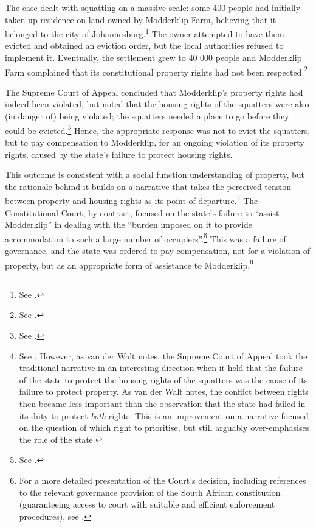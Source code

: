 The case dealt with squatting on a massive scale: some 400 people had initially taken up residence on land owned by Modderklip Farm, believing that it belonged to the city of Johannesburg.\footnote{See \cite[4]{modderklip05}.} The owner attempted to have them evicted and obtained an eviction order, but the local authorities refused to implement it. Eventually, the settlement grew to 40 000 people and Modderklip Farm complained that its constitutional property rights had not been respected.\footnote{See \cite[8]{modderklip05}.}

The Supreme Court of Appeal concluded that Modderklip's property rights had indeed been violated, but noted that the housing rights of the squatters were also (in danger of) being violated; the squatters needed a place to go before they could be evicted.\footnote{See \cite[21-26]{modderklip04}.} Hence, the appropriate response was not to evict the squatters, but to pay compensation to Modderklip, for an ongoing violation of its property rights, caused by the state's failure to protect housing rights.

This outcome is consistent with a social function understanding of property, but the rationale behind it builds on a narrative that takes the perceived tension between property and housing rights as its point of departure.\footnote{See \cite[152-156]{walt05}. However, as van der Walt notes, the Supreme Court of Appeal took the traditional narrative in an interesting direction when it held that the failure of the state to protect the housing rights of the squatters was the cause of its failure to protect property. As van der Walt notes, the conflict between rights then became less important than the observation that the state had failed in its duty to protect {\it both} rights. This is an improvement on a narrative focused on the question of which right to prioritise, but still arguably over-emphasises the role of the state.} The Constitutional Court, by contrast, focused on the state's failure to ``assist Modderklip'' in dealing with the ``burden imposed on it to provide accommodation to such a large number of occupiers''.\footnote{See \cite[49]{modderklip05}.} This was a failure of governance, and the state was ordered to pay compensation, not for a violation of property, but as an appropriate form of assistance to Modderklip.\footnote{For a more detailed presentation of the Court's decision, including references to the relevant governance provision of the South African constitution (guaranteeing access to court with suitable and efficient enforcement procedures), see \cite[156-158]{walt05}.} 

